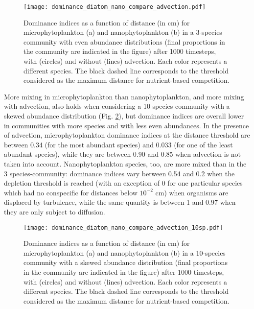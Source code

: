 \documentclass[12pt,english]{article}
\begin{document}
\begin{figure}[H]
\begin{centering}
\texttt{[image: dominance\_diatom\_nano\_compare\_advection.pdf]} 
\par\end{centering}
\caption{Dominance indices as a function of distance (in cm) for microphytoplankton
(a) and nanophytoplankton (b) in a 3-species community with even abundance
distributions (final proportions in the community are indicated in
the figure) after 1000 timesteps, with (circles) and without (lines)
advection. Each color represents a different species. The black dashed
line corresponds to the threshold considered as the maximum distance
for nutrient-based competition.\label{fig:Dominance-3sp}}
\end{figure}

More mixing in microphytoplankton than nanophytoplankton, and more
mixing with advection, also holds when considering a 10 species-community
with a skewed abundance distribution (Fig. \ref{fig:Dominance-10sp}),
but dominance indices are overall lower in communities with more species
and with less even abundances. In the presence of advection, microphytoplankton
dominance indices at the distance threshold are between 0.34 (for
the most abundant species) and 0.033 (for one of the least abundant
species), while they are between 0.90 and 0.85 when advection is not
taken into account. Nanophytoplankton species, too, are more mixed
than in the 3 species-community: dominance indices vary between 0.54
and 0.2 when the depletion threshold is reached (with an exception
of 0 for one particular species which had no conspecific for distances
below $10^{-2}$ cm) when organisms are displaced by turbulence, while
the same quantity is between 1 and 0.97 when they are only subject
to diffusion.

\begin{figure}[H]
\begin{centering}
\texttt{[image: dominance\_diatom\_nano\_compare\_advection\_10sp.pdf]} 
\par\end{centering}
\caption{Dominance indices as a function of distance (in cm) for microphytoplankton
(a) and nanophytoplankton (b) in a 10-species community with a skewed
abundance distribution (final proportions in the community are indicated
in the figure) after 1000 timesteps, with (circles) and without (lines)
advection. Each color represents a different species. The black dashed
line corresponds to the threshold considered as the maximum distance
for nutrient-based competition.\label{fig:Dominance-10sp}}
\end{figure}
\end{document}

